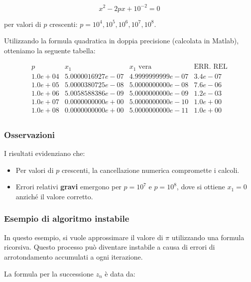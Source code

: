 \documentclass[a4paper, 11pt]{article}
\begin{document}
        \[
        x^2 - 2px + 10^{-2} = 0
        \]


        per valori di \( p \) crescenti: \( p = 10^4, 10^5, 10^6, 10^7, 10^8 \).

        Utilizzando la formula quadratica in doppia precisione (calcolata in Matlab), otteniamo la seguente tabella:



        \[
        \begin{array}{cccc}
        p & x_1 & x_1 \text{ vera} & \text{ERR. REL} \\
        1.0e+04 & 5.0000016927e-07 & 4.9999999999e-07 & 3.4e-07 \\
        1.0e+05 & 5.0000380725e-08 & 5.0000000000e-08 & 7.6e-06 \\
        1.0e+06 & 5.0058588386e-09 & 5.0000000000e-09 & 1.2e-03 \\
        1.0e+07 & 0.0000000000e+00 & 5.0000000000e-10 & 1.0e+00 \\
        1.0e+08 & 0.0000000000e+00 & 5.0000000000e-11 & 1.0e+00 \\
        \end{array}
        \]



        \subsubsection*{Osservazioni}
        I risultati evidenziano che:
        \begin{itemize}
            \item Per valori di \( p \) crescenti, la cancellazione numerica compromette i calcoli.
            \item Errori relativi \textbf{gravi} emergono per \( p = 10^7 \) e \( p = 10^8 \), dove si ottiene \( x_1 = 0 \) anziché il valore corretto.
        \end{itemize}


        \subsubsection*{Esempio di algoritmo instabile}

        In questo esempio, si vuole approssimare il valore di \( \pi \) utilizzando una formula ricorsiva. Questo processo può diventare instabile a causa di errori di arrotondamento accumulati a ogni iterazione.

        La formula per la successione \( z_n \) è data da:
\end{document}
